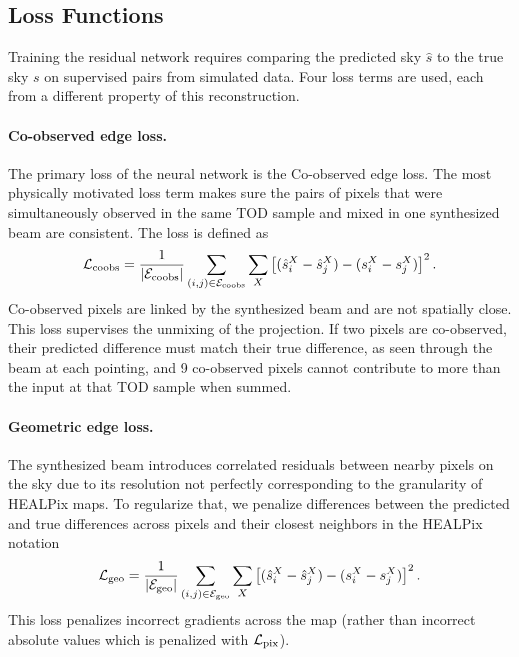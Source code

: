 \documentclass[a4paper,11pt]{article}
\begin{document}
\subsection{Loss Functions}
\label{subsec:losses}

Training the residual network requires comparing the predicted sky $\hat{s}$ to the true sky $s$ on supervised pairs from simulated data. Four loss terms are used, each from a different property of this reconstruction. 

\paragraph{Co-observed edge loss.}
The primary loss of the neural network is the Co-observed edge loss. The most physically motivated loss term makes sure the pairs of pixels that were simultaneously observed in the same TOD sample and mixed in one synthesized beam are consistent. The loss is defined as
\begin{equation}
    \mathcal{L}_{\rm coobs} = \frac{1}{|\mathcal{E}_{\rm coobs}|}
    \sum_{(i,j) \in \mathcal{E}_{\rm coobs}} \sum_X
    \left[(\hat{s}^X_i - \hat{s}^X_j) -
    (s^X_i - s^X_j)\right]^2.
    \label{eq:loss-coobs}
\end{equation}
Co-observed pixels are linked by the synthesized beam and are not spatially close. This loss supervises the unmixing of the projection. If two pixels are co-observed, their predicted difference must match their
true difference, as seen through the beam at each pointing, and 9 co-observed pixels cannot contribute to more than the input at that TOD sample when summed. 

\paragraph{Geometric edge loss.}
The synthesized beam introduces correlated residuals between nearby pixels on the sky due to its resolution not perfectly corresponding to the granularity of HEALPix maps. To regularize that, we penalize differences between the predicted and true differences across pixels and their closest neighbors in the HEALPix notation
\begin{equation}
    \mathcal{L}_{\rm geo} = \frac{1}{|\mathcal{E}_{\rm geo}|}
    \sum_{(i,j) \in \mathcal{E}_{\rm geo}} \sum_X
    \left[(\hat{s}^X_i - \hat{s}^X_j) -
    (s^X_i - s^X_j)\right]^2.
    \label{eq:loss-geo}
\end{equation}
This loss penalizes incorrect gradients across the map (rather than incorrect absolute values which is penalized with $\mathcal{L}_{\rm pix}$).
\end{document}
